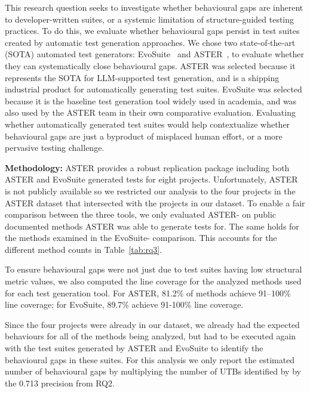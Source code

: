 This research question seeks to investigate whether behavioural gaps are inherent to developer-written suites, or a systemic limitation of structure-guided testing practices.
To do this, we evaluate whether behavioural gaps persist in test suites created by automatic test generation approaches.
We chose two state‑of‑the‑art (SOTA) automated test generators: EvoSuite~\cite{10.1145/2025113.2025179} and ASTER~\cite{Pan2024ASTERNA}, to evaluate whether they can systematically close behavioural gaps.
ASTER was selected because it represents the SOTA for LLM-supported test generation, and is a shipping industrial product for automatically generating test suites.
EvoSuite was selected because it is the baseline test generation tool widely used in academia, and was also used by the ASTER team in their own comparative evaluation.
Evaluating whether automatically generated test suites would help contextualize whether behavioural gaps are just a byproduct of misplaced human effort, or a more pervasive testing challenge. 

\smallskip
\noindent\textbf{Methodology:} 
ASTER provides a robust replication package including both ASTER and EvoSuite generated tests for eight projects.
Unfortunately, ASTER is not publicly available so we restricted our analysis to the four projects in the ASTER dataset that intersected with the projects in our dataset.
To enable a fair comparison between the three tools, we only evaluated ASTER-\toolname{} on public documented methods ASTER was able to generate tests for. The same holds for the methods examined in the EvoSuite-\toolname{} comparison. 
This accounts for the different method counts in Table~\ref{tab:rq3}.

To ensure behavioural gaps were not just due to test suites having low structural metric values, we also computed the line coverage for the analyzed methods used for each test generation tool.
For ASTER, 81.2\% of methods achieve 91–100\% line coverage; for EvoSuite, 89.7\% achieve 91-100\% line coverage.

Since the four projects were already in our dataset, we already had the expected behaviours for all of the methods being analyzed, but \toolname{} had to be executed again with the test suites generated by ASTER and EvoSuite to identify the behavioural gaps in these suites.
For this analysis we only report the estimated number of behavioural gaps by multiplying the number of UTBs identified by \toolname{} by the 0.713 precision from RQ2.


